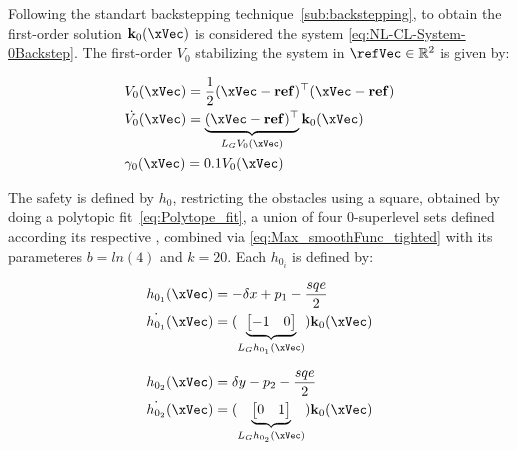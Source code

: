Following the standart backstepping technique~\ref{sub:backstepping}, to obtain the first-order solution \(\mathbf{k}_0(\xVec)\) is considered the system \ref{eq:NL-CL-System-0Backstep}. The first-order  \(V_0\) stabilizing the system in \(\refVec \in \mathbb{R}^2\) is given by:

\begin{subequations}
  \begin{align}
    &V_0(\xVec) = \frac{1}{2}(\xVec-\mathbf{ref})^{\top}(\xVec-\mathbf{ref}) \label{eq:V0_unicycle} \\
    &\dot{V_0}(\xVec) = \underbrace{(\xVec-\mathbf{ref})^{\top}}_{L_GV_0(\xVec)}\mathbf{k}_0(\xVec)  \label{eq:dot_V0_unicycle} \\
    &\gamma_0(\xVec)  = 0.1 V_0(\xVec) \label{eq:CLF_gamma0_unicycle}
  \end{align}
\label{eq:CLF0_unicycle}
\end{subequations}


The safety is defined by  \(h_0\), restricting the obstacles using a square, obtained by doing a polytopic fit~\ref{eq:Polytope_fit}, a union of four 0-superlevel sets defined according its respective , combined via \ref{eq:Max_smoothFunc_tighted} with its parameteres \(b = ln(4)\) and \(k = 20\). Each  \(h_{0_i}\) is defined by:

\begin{subequations}
   \begin{align}
    &h_{0_1}(\xVec) = -\delta x + p_1 - \frac{sqe}{2}\label{eq:h0_1_orbital} \\
    &\dot{h_{0_1}}(\xVec) = (\underbrace{\begin{bmatrix} -1 & 0 \end{bmatrix}}_{L_Gh_{0_1}(\xVec)})\mathbf{k}_0(\xVec)  \label{eq:dot_h0_1_unicycle} 
\end{align}
\label{eq:CBF0_1_orbital}
\end{subequations}

\begin{subequations}
   \begin{align}
    &h_{0_2}(\xVec) = \delta y - p_2 - \frac{sqe}{2}\label{eq:h0_2_orbital} \\
    &\dot{h_{0_2}}(\xVec) = (\underbrace{\begin{bmatrix} 0 & 1 \end{bmatrix}}_{L_Gh_{0_2}(\xVec)})\mathbf{k}_0(\xVec)  \label{eq:dot_h0_2_unicycle} 
\end{align}
\label{eq:CBF0_2_orbital}
\end{subequations}

